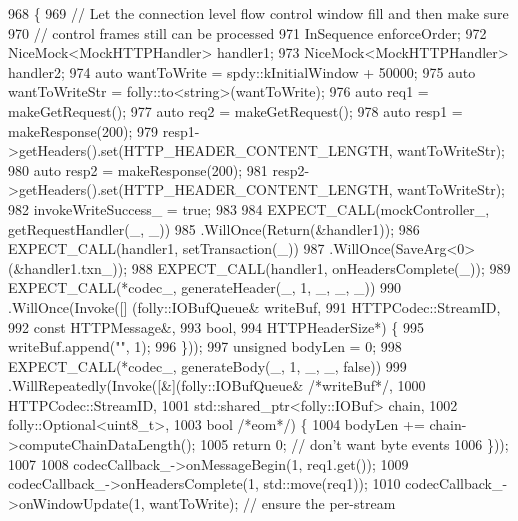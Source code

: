 \begin{DoxyCode}
968                                                                      \{
969   \textcolor{comment}{// Let the connection level flow control window fill and then make sure}
970   \textcolor{comment}{// control frames still can be processed}
971   InSequence enforceOrder;
972   NiceMock<MockHTTPHandler> handler1;
973   NiceMock<MockHTTPHandler> handler2;
974   \textcolor{keyword}{auto} wantToWrite = spdy::kInitialWindow + 50000;
975   \textcolor{keyword}{auto} wantToWriteStr = folly::to<string>(wantToWrite);
976   \textcolor{keyword}{auto} req1 = makeGetRequest();
977   \textcolor{keyword}{auto} req2 = makeGetRequest();
978   \textcolor{keyword}{auto} resp1 = makeResponse(200);
979   resp1->getHeaders().set(HTTP\_HEADER\_CONTENT\_LENGTH, wantToWriteStr);
980   \textcolor{keyword}{auto} resp2 = makeResponse(200);
981   resp2->getHeaders().set(HTTP\_HEADER\_CONTENT\_LENGTH, wantToWriteStr);
982   invokeWriteSuccess_ = \textcolor{keyword}{true};
983 
984   EXPECT\_CALL(mockController_, getRequestHandler(\_, \_))
985     .WillOnce(Return(&handler1));
986   EXPECT\_CALL(handler1, setTransaction(\_))
987     .WillOnce(SaveArg<0>(&handler1.txn\_));
988   EXPECT\_CALL(handler1, onHeadersComplete(\_));
989   EXPECT\_CALL(*codec_, generateHeader(\_, 1, \_, \_, \_))
990     .WillOnce(Invoke([] (folly::IOBufQueue& writeBuf,
991                          HTTPCodec::StreamID,
992                          \textcolor{keyword}{const} HTTPMessage&,
993                          \textcolor{keywordtype}{bool},
994                          HTTPHeaderSize*) \{
995                        writeBuf.append(\textcolor{stringliteral}{""}, 1);
996                      \}));
997   \textcolor{keywordtype}{unsigned} bodyLen = 0;
998   EXPECT\_CALL(*codec_, generateBody(\_, 1, \_, \_, \textcolor{keyword}{false}))
999       .WillRepeatedly(Invoke([&](folly::IOBufQueue& \textcolor{comment}{/*writeBuf*/},
1000                                  HTTPCodec::StreamID,
1001                                  std::shared\_ptr<folly::IOBuf> chain,
1002                                  folly::Optional<uint8\_t>,
1003                                  \textcolor{keywordtype}{bool} \textcolor{comment}{/*eom*/}) \{
1004         bodyLen += chain->computeChainDataLength();
1005         \textcolor{keywordflow}{return} 0; \textcolor{comment}{// don't want byte events}
1006       \}));
1007 
1008   codecCallback_->onMessageBegin(1, req1.get());
1009   codecCallback_->onHeadersComplete(1, std::move(req1));
1010   codecCallback_->onWindowUpdate(1, wantToWrite); \textcolor{comment}{// ensure the per-stream}

\end{DoxyCode}
